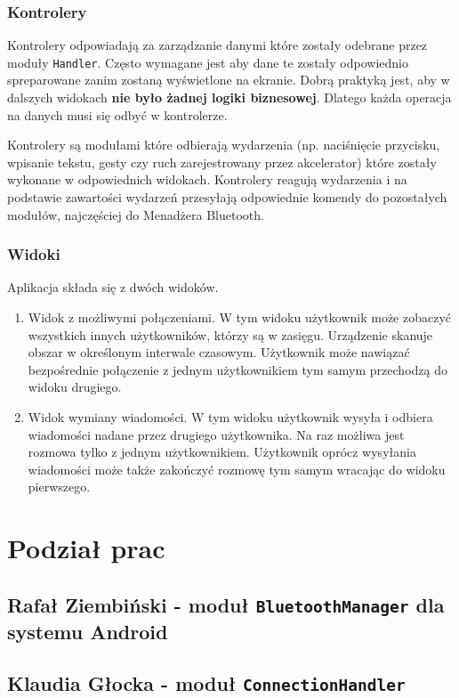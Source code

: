 \documentclass[a4paper, titlepage]{article}
\begin{document}
\subsubsection{Kontrolery}
\label{sec-1-2-5}
Kontrolery odpowiadają za zarządzanie danymi które zostały odebrane przez moduły \texttt{Handler}.
Często wymagane jest aby dane te zostały odpowiednio spreparowane zanim zostaną wyświetlone na ekranie.
Dobrą praktyką jest, aby w dalszych widokach \textbf{nie było żadnej logiki biznesowej}. Dlatego każda operacja na danych musi się odbyć w kontrolerze.

Kontrolery są modułami które odbierają wydarzenia (np. naciśnięcie przycisku, wpisanie tekstu, gesty czy ruch zarejestrowany przez akcelerator) które zostały wykonane w odpowiednich widokach.
Kontrolery reagują wydarzenia i na podstawie zawartości wydarzeń przesyłają odpowiednie komendy do pozostałych modułów, najczęściej do Menadżera Bluetooth.
\subsubsection{Widoki}
\label{sec-1-2-6}
Aplikacja składa się z dwóch widoków.
\begin{enumerate}
\item Widok z możliwymi połączeniami. 
W tym widoku użytkownik może zobaczyć wszystkich innych użytkowników, którzy są w zasięgu.
Urządzenie skanuje obszar w określonym interwale czasowym.
Użytkownik może nawiązać bezpośrednie połączenie z jednym użytkownikiem tym samym przechodzą do widoku drugiego.
\item Widok wymiany wiadomości.
W tym widoku użytkownik wysyła i odbiera wiadomości nadane przez drugiego użytkownika. Na raz możliwa jest rozmowa tylko z jednym użytkownikiem.
Użytkownik oprócz wysyłania wiadomości może także zakończyć rozmowę tym samym wracając do widoku pierwszego.
\end{enumerate}
\section{Podział prac}
\label{sec-2}
\subsection{Rafał Ziembiński - moduł \texttt{BluetoothManager} dla systemu Android}
\label{sec-2-1}
\subsection{Klaudia Głocka - moduł \texttt{ConnectionHandler}}
\label{sec-2-2}
\end{document}
